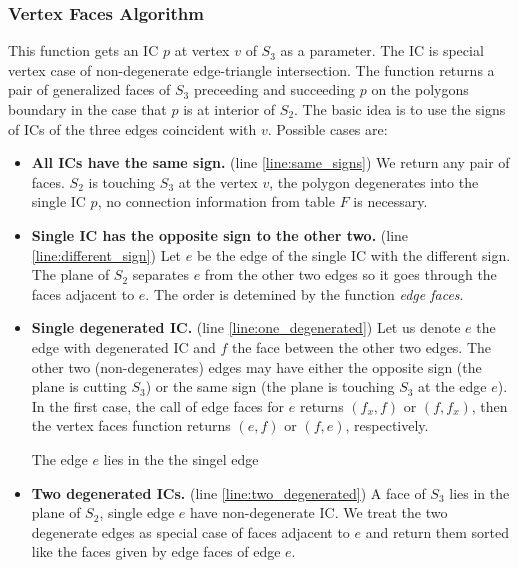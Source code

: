 \documentclass{elsarticle}
\begin{document}
\subsubsection{Vertex Faces Algorithm}
This function gets an IC $p$ at vertex $v$ of $S_3$ as a parameter. The IC is special vertex case of non-degenerate edge-triangle intersection. 
The function returns a pair of generalized faces of $S_3$ preceeding and succeeding $p$ on the polygons boundary in the case that $p$ is at interior of $S_2$.
The basic idea is to use the signs of ICs of the three edges coincident with $v$. 
Possible cases are:
\begin{itemize}
 \item {\bf All ICs have the same sign.} (line \ref{line:same_signs}) We return any pair of faces.  $S_2$ is touching $S_3$ 
 at the vertex $v$, the polygon degenerates into the single IC $p$, no connection information from table $F$ is necessary.
 \item {\bf Single IC has the opposite sign to the other two.} (line \ref{line:different_sign}) Let $e$ be the edge of the single IC with the different sign. 
 The plane of $S_2$ separates $e$ from the other two edges so it goes through the faces adjacent to $e$. The order is detemined by the function \emph{edge faces}.
 \item {\bf Single degenerated IC.} (line \ref{line:one_degenerated}) Let us denote $e$ the edge with degenerated IC and $f$ the face between the other two edges.
 The other two (non-degenerates) edges may have either the opposite sign (the plane is cutting $S_3$) or the same sign (the plane is touching $S_3$ at the edge $e$).
 In the first case, the call of edge faces for $e$ returns $(f_x,f)$ or $(f,f_x)$, then the vertex faces function returns $(e, f)$ or $(f, e)$, respectively.
 
 
 The edge $e$ lies in the the singel edge
 \item {\bf Two degenerated ICs.} (line \ref{line:two_degenerated}) A face of $S_3$ lies in the plane of $S_2$, single edge $e$ have non-degenerate IC.
 We treat the two degenerate edges as special case of faces adjacent to $e$ and return them sorted like the faces given by edge faces of edge $e$.
\end{itemize}
\end{document}
